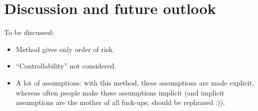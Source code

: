\section{Discussion and future outlook} %
\label{sec:discussion}

To be discussed:
\begin{itemize}
	\item Method gives only order of risk.
	\item ``Controllability'' not considered.
	\item A lot of assumptions: with this method, these assumptions are made explicit, whereas often people make these assumptions implicit (and implicit assumptions are the mother of all fuck-ups; should be rephrased :)).
\end{itemize}